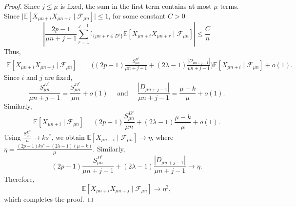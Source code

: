 \documentclass[10pt,a4paper]{amsart}
\newcommand{\E}{\mbox{${\mathbb E}$}}
\newcommand{\FF}{\mbox{${\mathcal F}$}}
\newcommand{\I}{\mbox{${\mathbb I}$}}
\begin{document}
\begin{proof}
Since $j\le \mu$ is fixed, the sum in the first term contains at most $\mu$ terms. Since $\vert \E[X_{\mu n+i}X_{\mu n+r}\mid \FF_{\mu n}] \vert
\leq 1$, for some constant $C>0$
\begin{equation*} 
\left|
\frac{2p-1}{\mu n+j-1}
\sum_{r=1}^{j-1}
\I_{\{\mu n+r\in D^c\}}
\E[X_{\mu n+i}X_{\mu n+r}\mid \FF_{\mu n}]
\right|
\le
\frac{C}{n}    
\end{equation*}
Thus,
\begin{align*}
\E[X_{\mu n+i}X_{\mu n+j}\mid \FF_{\mu n}]
&=
\Bigg(
(2p-1)\frac{S_{\mu n}^{D^c}}{\mu n+j-1}
+ (2\lambda-1)\frac{|D_{\mu n+j-1}|}{\mu n+j-1}
\Bigg)
\E[X_{\mu n+i}\mid \FF_{\mu n}] +o(1).
\end{align*}
Since $i$ and $j$ are fixed,
\[
\frac{S_{\mu n}^{D^c}}{\mu n+j-1} = \frac{S_{\mu n}^{D^c}}{\mu n} +o(1)
\quad \text{ and } \quad 
\frac{|D_{\mu n+j-1}|}{\mu n+j-1} =
\frac{\mu-k}{\mu}+o(1).
\]
Similarly,
\[ 
\E[X_{\mu n+i}\mid \FF_{\mu n}] = (2p-1)\frac{S_{\mu n}^{D^c}}{\mu n} + (2\lambda-1)\frac{\mu-k}{\mu}
+o(1).
\]
Using $\frac{S_{\mu n}^{D^c}}{n} \longrightarrow ks^*$, 
we obtain $\E[X_{\mu n+i}\mid \FF_{\mu n}]
\longrightarrow \eta$,
where $\eta = \frac{(2p-1)ks^*+(2\lambda-1)(\mu-k)}{\mu}$. Similarly, 
\[
(2p-1)\frac{S_{\mu n}^{D^c}}{\mu n+j-1}
+ (2\lambda-1)\frac{|D_{\mu n+j-1}|}{\mu n+j-1} \longrightarrow \eta.
\]
Therefore,
\[
\E[X_{\mu n+i}X_{\mu n+j}\mid \FF_{\mu n}]
\longrightarrow
\eta^2,
\]
which completes the proof.
\end{proof}
\end{document}
